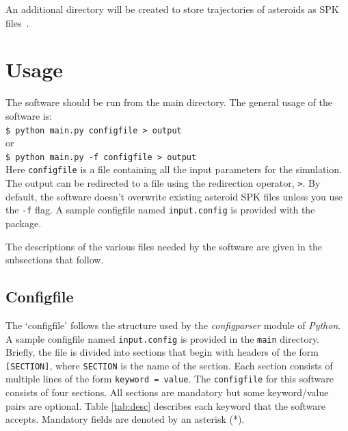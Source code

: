\documentclass[10pt,a4paper]{article}
\begin{document}
An additional directory will be created to store trajectories of
asteroids as SPK files~\citep{spice}.


\section{Usage}

The software should be run from the main directory. The general usage
of the software is: \\

\verb+$ python main.py configfile > output+ \\
or \\
\verb+$ python main.py -f configfile > output+ \\

Here \verb+configfile+ is a file containing all the input parameters
for the simulation. The output can be redirected to a file using the
redirection operator, \verb+>+. By default, the software doesn't
overwrite existing asteroid SPK files unless you use the \verb+-f+
flag. A sample configfile named \verb+input.config+ is provided with
the package.

The descriptions of the various files needed by the software are given
in the subsections that follow.

\subsection{Configfile}

The `configfile' follows the structure used by the \emph{configparser}
module of \emph{Python}. A sample configfile named \verb+input.config+
is provided in the \verb+main+ directory. Briefly, the file is divided
into sections that begin with headers of the form \verb+[SECTION]+,
where \verb+SECTION+ is the name of the section. Each section consists
of multiple lines of the form \verb+keyword = value+.  The
\verb+configfile+ for this software consists of four sections. All
sections are mandatory but some keyword/value pairs are optional.
Table \ref{tab:desc} describes each keyword that the software
accepts. Mandatory fields are denoted by an asterisk (*).
\end{document}
